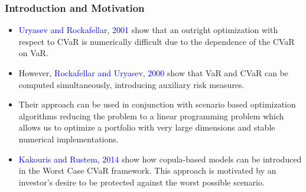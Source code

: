 \documentclass[pdf,9pt,xcolor=dvipsnames,hide notes]{beamer}
\begin{document}
\begin{frame}[label=frame1b]
	\frametitle{Introduction and Motivation}
	
	\begin{itemize}
		\justifying
		
\vspace{0.3cm}

%

	\item \textcolor{blue}{Uryasev and Rockafellar}, \textcolor{blue}{2001} show that an outright optimization with respect to CVaR is numerically difficult due to the dependence of the
CVaR on VaR. 

\vspace{0.3cm}

	\item However, \textcolor{blue}{Rockafellar and Uryasev}, \textcolor{blue}{2000} show that VaR and CVaR can be	computed simultaneously, introducing auxiliary risk measures. 
	
	\vspace{0.3cm}
	
	\item Their approach can be
	used in conjunction with scenario based optimization algorithms reducing the
	problem to a linear programming problem which allows us to optimize a portfolio with very large dimensions and stable numerical implementations.
	
	\vspace{0.3cm}
	
	\item \textcolor{blue}{Kakouris and Rustem}, \textcolor{blue}{2014} show how copula-based models can be
	introduced in the Worst Case CVaR framework. This approach is
	motivated by an investor's desire to be protected against the worst possible
	scenario.

	
    \end{itemize}
	
\end{frame}
\end{document}
